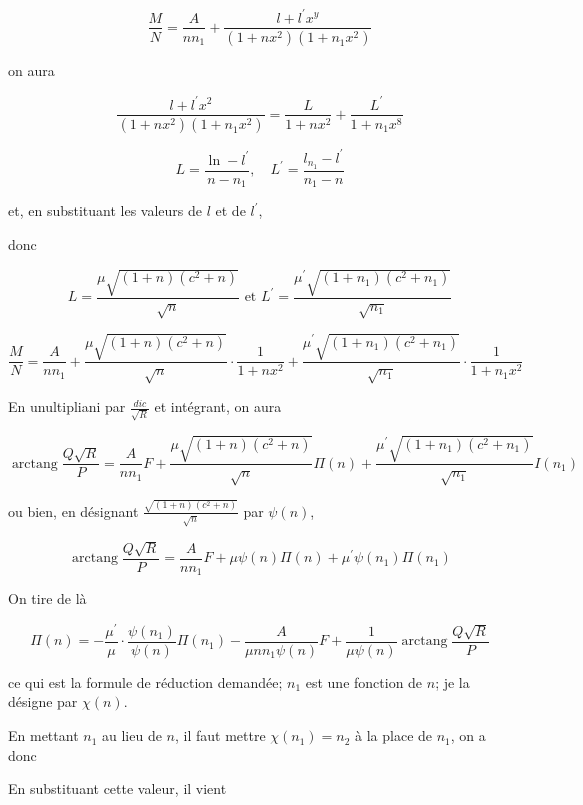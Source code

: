 \documentclass{article}
\begin{document}
\[
\frac{M}{N}=\frac{A}{n n_{1}}+\frac{l+l^{\prime} x^{y}}{\left(1+n x^{2}\right)\left(1+n_{1} x^{2}\right)}
\]

on aura

\[
\frac{l+l^{\prime} x^{2}}{\left(1+n x^{2}\right)\left(1+n_{1} x^{2}\right)}=\frac{L}{1+n x^{2}}+\frac{L^{\prime}}{1+n_{1} x^{8}}
\]

\[
L=\frac{\ln -l^{\prime}}{n-n_{1}}, \quad L^{\prime}=\frac{l_{n_{1}}-l^{\prime}}{n_{1}-n}
\]

et, en substituant les valeurs de \(l\) et de \(l^{\prime}\),

donc

\[
L=\frac{\mu \sqrt{(1+n)\left(c^{2}+n\right)}}{\sqrt{n}} \text { et } L^{\prime}=\frac{\mu^{\prime} \sqrt{\left(1+n_{1}\right)\left(c^{2}+n_{1}\right)}}{\sqrt{n_{1}}}
\]

\[
\frac{M}{N}=\frac{A}{n n_{1}}+\frac{\mu \sqrt{(1+n)\left(c^{2}+n\right)}}{\sqrt{n}} \cdot \frac{1}{1+n x^{2}}+\frac{\mu^{\prime} \sqrt{\left(1+n_{1}\right)\left(c^{2}+n_{1}\right)}}{\sqrt{n_{1}}} \cdot \frac{1}{1+n_{1} x^{2}}
\]

En unultipliani par \(\frac{d i c}{\sqrt{R}}\) et intégrant, on aura

\[
\operatorname{arctang} \frac{Q \sqrt{R}}{P}=\frac{A}{n n_{1}} F+\frac{\mu \sqrt{(1+n)\left(c^{2}+n\right)}}{\sqrt{n}} \Pi(n)+\frac{\mu^{\prime} \sqrt{\left(1+n_{1}\right)\left(c^{2}+n_{1}\right)}}{\sqrt{n_{1}}} I\left(n_{1}\right)
\]

ou bien, en désignant \(\frac{\sqrt{(1+n)\left(c^{2}+n\right)}}{\sqrt{n}}\) par \(\psi(n)\),

\[
\operatorname{arctang} \frac{Q \sqrt{R}}{P}=\frac{A}{n n_{1}} F+\mu \psi(n) \Pi(n)+\mu^{\prime} \psi\left(n_{1}\right) \Pi\left(n_{1}\right)
\]

On tire de là

\[
\Pi(n)=-\frac{\mu^{\prime}}{\mu} \cdot \frac{\psi\left(n_{1}\right)}{\psi(n)} \Pi\left(n_{1}\right)-\frac{A}{\mu n n_{1} \psi(n)} F+\frac{1}{\mu \psi(n)} \operatorname{arctang} \frac{Q \sqrt{R}}{P}
\]

ce qui est la formule de réduction demandée; \(n_{1}\) est une fonction de \(n\); je la désigne par \(\chi(n)\).

En mettant \(n_{1}\) au lieu de \(n\), il faut mettre \(\chi\left(n_{1}\right)=n_{2}\) à la place de \(n_{1}\), on a donc


En substituant cette valeur, il vient
\end{document}
